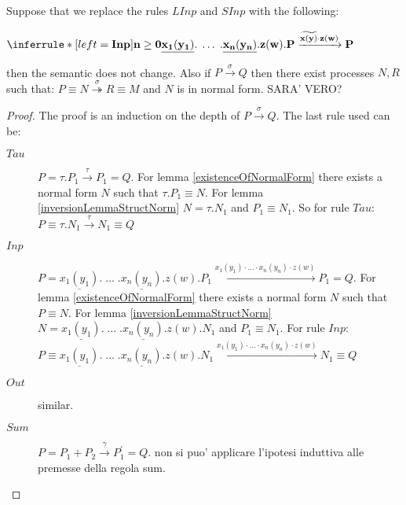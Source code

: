 \begin{proposition}\label{moveCongDownNorm}
  Suppose that we replace the rules $LInp$ and $SInp$ with the following:
  \begin{center}
    $\inferrule* [left=\bf{Inp}]{
      n \geq 0
    }{
      \underline{x_{1}(y_{1})}.\; \ldots\; .\underline{x_{n}(y_{n})}.z(w).P 
	\xrightarrow{\widetilde{x(y)} \cdot z(w)} 
	  P
    }$
  \end{center}
  then the semantic does not change. Also if $P\xrightarrow{\sigma} Q$ then there exist processes $N,R$ such that: $P \equiv N\stackrel{\sigma}{\twoheadrightarrow} R \equiv M$ and $N$ is in normal form.
  SARA' VERO?
  \begin{proof}
    The proof is an induction on the depth of $P\xrightarrow{\sigma} Q$. The last rule used can be:
    \begin{description}
      \item[$Tau$] 
	$P=\tau.P_{1} \xrightarrow{\tau} P_{1}=Q$. For lemma \ref{existenceOfNormalForm} there exists a normal form $N$ such that $\tau.P_{1}\equiv N$. For lemma \ref{inversionLemmaStructNorm} $N=\tau.N_{1}$ and $P_{1}\equiv N_{1}$. So for rule $Tau$: $P \equiv \tau.N_{1}\xrightarrow{\tau} N_{1} \equiv Q$ 
      \item[$Inp$]
	$P=\underline{x_{1}(y_{1})}.\; \ldots\; .\underline{x_{n}(y_{n})}.z(w).P_{1}
	  \xrightarrow{x_{1}(y_{1})\cdot \ldots \cdot x_{n}(y_{n})\cdot z(w)} 
	    P_{1}=Q$. For lemma \ref{existenceOfNormalForm} there exists a normal form $N$ such that $P\equiv N$. For lemma \ref{inversionLemmaStructNorm} $N=\underline{x_{1}(y_{1})}.\; \ldots\; .\underline{x_{n}(y_{n})}.z(w).N_{1}$ and $P_{1}\equiv N_{1}$. For rule $Inp$: 
	    $P\equiv \underline{x_{1}(y_{1})}.\; \ldots\; .\underline{x_{n}(y_{n})}.z(w).N_{1}
	      \xrightarrow{x_{1}(y_{1})\cdot \ldots \cdot x_{n}(y_{n})\cdot z(w)} 
		N_{1}\equiv Q$
      \item[$Out$] 
	similar.
      \item[$Sum$]
	$P=P_{1}+P_{2} \xrightarrow{\gamma} P_{1}^{'}=Q$. non si puo' applicare l'ipotesi induttiva alle premesse della regola sum.
    \end{description}
  \end{proof}
\end{proposition}

